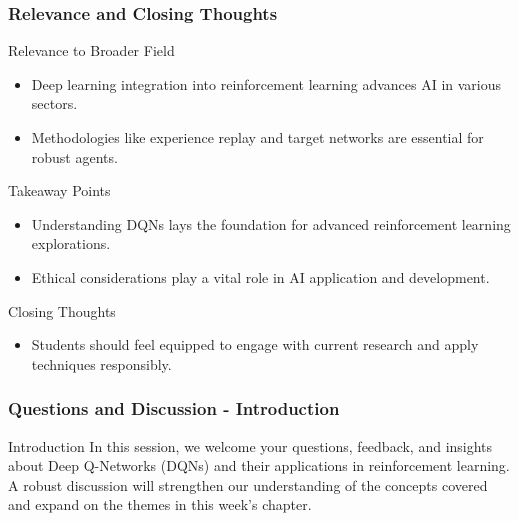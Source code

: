 \documentclass[aspectratio=169]{beamer}
\begin{document}
\begin{frame}[fragile]
    \frametitle{Relevance and Closing Thoughts}
    \begin{block}{Relevance to Broader Field}
        \begin{itemize}
            \item Deep learning integration into reinforcement learning advances AI in various sectors.
            \item Methodologies like experience replay and target networks are essential for robust agents.
        \end{itemize}
    \end{block}

    \begin{block}{Takeaway Points}
        \begin{itemize}
            \item Understanding DQNs lays the foundation for advanced reinforcement learning explorations.
            \item Ethical considerations play a vital role in AI application and development.
        \end{itemize}
    \end{block}

    \begin{block}{Closing Thoughts}
        \begin{itemize}
            \item Students should feel equipped to engage with current research and apply techniques responsibly.
        \end{itemize}
    \end{block}
\end{frame}

\begin{frame}[fragile]
    \frametitle{Questions and Discussion - Introduction}
    \begin{block}{Introduction}
        In this session, we welcome your questions, feedback, and insights about Deep Q-Networks (DQNs) and their applications in reinforcement learning. 
        A robust discussion will strengthen our understanding of the concepts covered and expand on the themes in this week's chapter.
    \end{block}
\end{frame}
\end{document}
